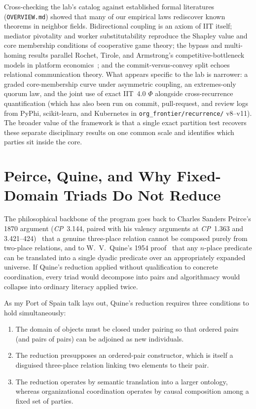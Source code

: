 \documentclass[11pt,a4paper]{article}
\begin{document}
Cross-checking the lab's catalog against established formal literatures (\texttt{OVERVIEW.md}) showed that many of our empirical laws rediscover known theorems in neighbor fields. Bidirectional coupling is an axiom of IIT itself; mediator pivotality and worker substitutability reproduce the Shapley value and core membership conditions of cooperative game theory; the bypass and multi-homing results parallel Rochet, Tirole, and Armstrong's competitive-bottleneck models in platform economics~\cite{rochet2003platform,armstrong2006competition}; and the commit-versus-convey split echoes relational communication theory. What appears specific to the lab is narrower: a graded core-membership curve under asymmetric coupling, an extremes-only quorum law, and the joint use of exact IIT~4.0 $\Phi$ alongside cross-recurrence quantification (which has also been run on commit, pull-request, and review logs from PyPhi, scikit-learn, and Kubernetes in \texttt{org\_frontier/recurrence/} v8--v11). The broader value of the framework is that a single exact partition test recovers these separate disciplinary results on one common scale and identifies which parties sit inside the core.

\section{Peirce, Quine, and Why Fixed-Domain Triads Do Not Reduce}

The philosophical backbone of the program goes back to Charles Sanders Peirce's 1870 argument (\emph{CP}~3.144, paired with his valency arguments at \emph{CP}~1.363 and 3.421--424)~\cite{peirce1870description} that a genuine three-place relation cannot be composed purely from two-place relations, and to W.~V.~Quine's 1954 proof~\cite{quine1954reduction} that any $n$-place predicate can be translated into a single dyadic predicate over an appropriately expanded universe. If Quine's reduction applied without qualification to concrete coordination, every triad would decompose into pairs and algorithmacy would collapse into ordinary literacy applied twice.

As my Port of Spain talk lays out, Quine's reduction requires three conditions to hold simultaneously:
\begin{enumerate}[leftmargin=1.8em,itemsep=0.2em]
  \item The domain of objects must be closed under pairing so that ordered pairs (and pairs of pairs) can be adjoined as new individuals.
  \item The reduction presupposes an ordered-pair constructor, which is itself a disguised three-place relation linking two elements to their pair.
  \item The reduction operates by semantic translation into a larger ontology, whereas organizational coordination operates by causal composition among a fixed set of parties.
\end{enumerate}
\end{document}

